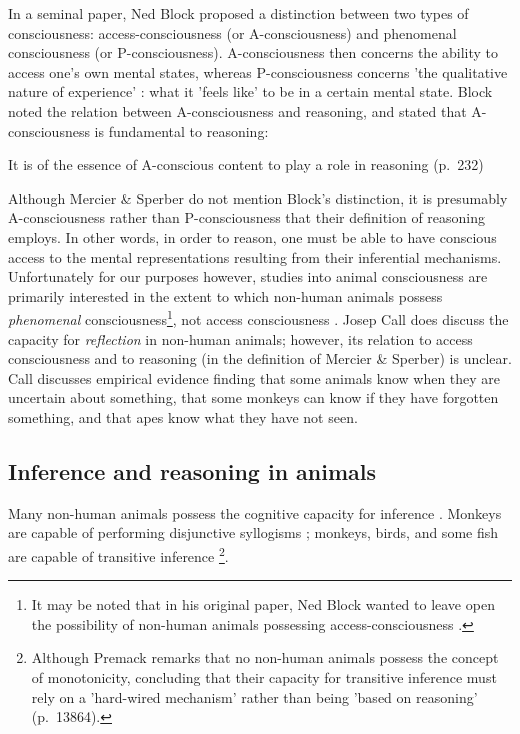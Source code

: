 In a seminal \citeyear{Block95} paper, Ned Block proposed a distinction between two types of consciousness: access-consciousness (or A-consciousness) and phenomenal consciousness (or P-consciousness). A-consciousness then concerns the ability to access one's own mental states, whereas P-consciousness concerns 'the qualitative nature of experience' \citep[p.~52]{Andrews15}: what it 'feels like' to be in a certain mental state. 
Block noted the relation between A-consciousness and reasoning, and stated that A-consciousness is fundamental to reasoning:
\begin{quoting}
    It is of the essence of A-conscious content to play a role in reasoning
\hfill (p.~232)
\end{quoting}
Although Mercier \& Sperber do not mention Block's distinction, it is presumably A-consciousness rather than P-consciousness that their definition of reasoning employs. In other words, in order to reason, one must be able to have conscious access to the mental representations resulting from their inferential mechanisms.
Unfortunately for our purposes however, studies into animal consciousness are primarily interested in the extent to which non-human animals possess \emph{phenomenal} consciousness\footnote{It may be noted that in his original paper, Ned Block wanted to leave open the possibility of non-human animals possessing access-consciousness \citep{Block95}.}, not access consciousness \citep{Andrews15, Carruthers18}.
Josep Call \citeyear{Call06} does discuss the capacity for \emph{reflection} in non-human animals; however, its relation to access consciousness and to reasoning (in the definition of Mercier \& Sperber) is unclear. Call discusses empirical evidence finding that some animals know when they are uncertain about something, that some monkeys can know if they have forgotten something, and that apes know what they have not seen. 

\subsection{Inference and reasoning in animals}

Many non-human animals possess the cognitive capacity for inference . Monkeys are capable of performing disjunctive syllogisms \citep{Ferrigno21}; monkeys, birds, and some fish are capable of transitive inference \citep{Premack07}\footnote{Although Premack remarks that no non-human animals possess the concept of monotonicity, concluding that their capacity for transitive inference must rely on a 'hard-wired mechanism' rather than being 'based on reasoning' (p.~13864).}.

